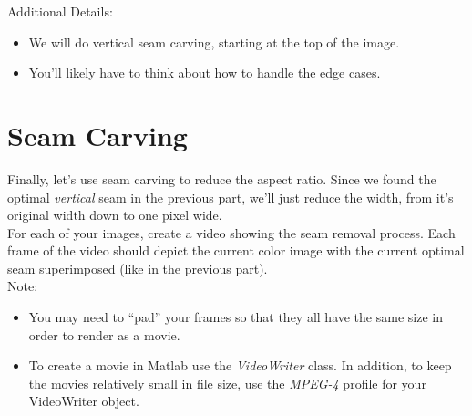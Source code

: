 \documentclass{article}
\begin{document}
\noindent
Additional Details:
\begin{itemize}
\item We will do vertical seam carving, starting at the top of the image.
\item You’ll likely have to think about how to handle the edge cases.
\end{itemize}

\noindent

\begin{figure}[h!]
    \centering
\end{figure}

\newpage

\section{Seam Carving}
Finally, let's use seam carving to reduce the aspect ratio. Since we found the optimal \emph{vertical} seam in the previous part, we'll just reduce the width, from it's original width down to one pixel wide. \\

\noindent
For each of your images, create a video showing the seam removal process.  Each frame of the video should depict the current color image with the current optimal seam superimposed (like in the previous part). \\

\noindent
Note:
\begin{itemize}
\item You may need to “pad” your frames so that they all have the same size in order to render as a movie.
\item To create a movie in Matlab use the \emph{VideoWriter} class.  In addition, to keep the movies relatively small in file size, use the \emph{MPEG-4} profile for your VideoWriter object.
\end{itemize}

\newpage
\end{document}
